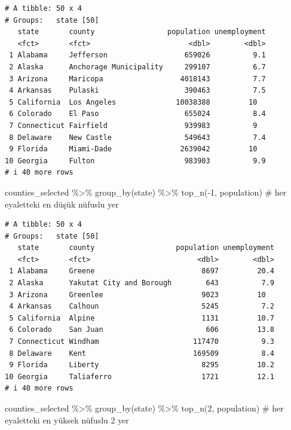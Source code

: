 \documentclass[
  letterpaper,
  DIV=11,
  numbers=noendperiod]{scrreprt}
\newenvironment{Shaded}{\begin{snugshade}}{\end{snugshade}}
\newcommand{\CommentTok}[1]{\textcolor[rgb]{0.37,0.37,0.37}{#1}}
\newcommand{\DecValTok}[1]{\textcolor[rgb]{0.68,0.00,0.00}{#1}}
\newcommand{\FunctionTok}[1]{\textcolor[rgb]{0.28,0.35,0.67}{#1}}
\newcommand{\NormalTok}[1]{\textcolor[rgb]{0.00,0.23,0.31}{#1}}
\newcommand{\SpecialCharTok}[1]{\textcolor[rgb]{0.37,0.37,0.37}{#1}}
\begin{document}
\begin{verbatim}
# A tibble: 50 x 4
# Groups:   state [50]
   state       county                 population unemployment
   <fct>       <fct>                       <dbl>        <dbl>
 1 Alabama     Jefferson                  659026          9.1
 2 Alaska      Anchorage Municipality     299107          6.7
 3 Arizona     Maricopa                  4018143          7.7
 4 Arkansas    Pulaski                    390463          7.5
 5 California  Los Angeles              10038388         10  
 6 Colorado    El Paso                    655024          8.4
 7 Connecticut Fairfield                  939983          9  
 8 Delaware    New Castle                 549643          7.4
 9 Florida     Miami-Dade                2639042         10  
10 Georgia     Fulton                     983903          9.9
# i 40 more rows
\end{verbatim}

\begin{Shaded}
\begin{Highlighting}[]
\NormalTok{counties\_selected }\SpecialCharTok{\%\textgreater{}\%}
\FunctionTok{group\_by}\NormalTok{(state) }\SpecialCharTok{\%\textgreater{}\%}
\FunctionTok{top\_n}\NormalTok{(}\SpecialCharTok{{-}}\DecValTok{1}\NormalTok{, population) }\CommentTok{\# her eyaletteki en düşük nüfuslu yer}
\end{Highlighting}
\end{Shaded}

\begin{verbatim}
# A tibble: 50 x 4
# Groups:   state [50]
   state       county                   population unemployment
   <fct>       <fct>                         <dbl>        <dbl>
 1 Alabama     Greene                         8697         20.4
 2 Alaska      Yakutat City and Borough        643          7.9
 3 Arizona     Greenlee                       9023         10  
 4 Arkansas    Calhoun                        5245          7.2
 5 California  Alpine                         1131         10.7
 6 Colorado    San Juan                        606         13.8
 7 Connecticut Windham                      117470          9.3
 8 Delaware    Kent                         169509          8.4
 9 Florida     Liberty                        8295         10.2
10 Georgia     Taliaferro                     1721         12.1
# i 40 more rows
\end{verbatim}

\begin{Shaded}
\begin{Highlighting}[]
\NormalTok{counties\_selected }\SpecialCharTok{\%\textgreater{}\%}
\FunctionTok{group\_by}\NormalTok{(state) }\SpecialCharTok{\%\textgreater{}\%}
\FunctionTok{top\_n}\NormalTok{(}\DecValTok{2}\NormalTok{, population) }\CommentTok{\# her eyaletteki en yüksek nüfuslu 2 yer}
\end{Highlighting}
\end{Shaded}
\end{document}
